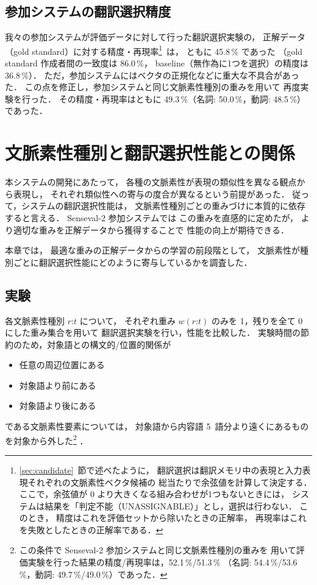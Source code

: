 \subsection{参加システムの翻訳選択精度}
我々の参加システムが評価データに対して行った翻訳選択実験の，
正解データ（gold standard）に対する精度・再現率\footnote{
\ref{sec:candidate}~節で述べたように，
翻訳選択は翻訳メモリ中の表現と入力表現それぞれの文脈素性ベクタ候補の
総当たりで余弦値を計算して決定する．
ここで，余弦値が 0 より大きくなる組み合わせが1つもないときには，
システムは結果を「判定不能（UNASSIGNABLE）」とし，選択は行わない．
このとき，
精度はこれを評価セットから除いたときの正解率，
再現率はこれを失敗としたときの正解率である．
}\
は，
ともに 45.8\,\% であった
（gold standard 作成者間の一致度は 86.0\,\%，
baseline（無作為に1つを選択）の精度は 36.8\,\%）．
ただ，参加システムにはベクタの正規化などに重大な不具合があった．
この点を修正し，参加システムと同じ文脈素性種別の重みを用いて
再度実験を行った．
その精度・再現率はともに 49.3\,\%（名詞: 50.0\,\%，動詞: 48.5\,\%）であった．



\section{文脈素性種別と翻訳選択性能との関係}
\label{sec:vector_component}
本システムの開発にあたって，
各種の文脈素性が表現の類似性を異なる観点から表現し，
それぞれ類似性への寄与の度合が異なるという前提があった．
従って，システムの翻訳選択性能は，
文脈素性種別ごとの重みづけに本質的に依存すると言える．
{\sc Senseval}-2 参加システムでは
この重みを直感的に定めたが，
より適切な重みを正解データから獲得することで
性能の向上が期待できる．

本章では，
最適な重みの正解データからの学習の前段階として，
文脈素性が種別ごとに翻訳選択性能にどのように寄与しているかを調査した．

\subsection{実験}
各文脈素性種別 $r$:$t$ について，
それぞれ重み $w(\mbox{$r$:$t$})$ のみを 1，残りを全て 0 にした重み集合を用いて
翻訳選択実験を行い，性能を比較した．
実験時間の節約のため，対象語との構文的/位置的関係が
\begin{itemize}
 \item 任意の周辺位置にある
 \item 対象語より前にある
 \item 対象語より後にある
\end{itemize}
である文脈素性要素については，
対象語から内容語 5~語分より遠くにあるものを対象から外した\footnote{
この条件で {\sc Senseval}-2 参加システムと同じ文脈素性種別の重みを
用いて評価実験を行った結果の精度/再現率は，52.1\,\%/51.3\,\%
（名詞: 54.4\,\%/53.6\,\%，動詞: 49.7\,\%/49.0\,\%）であった．
}
．

